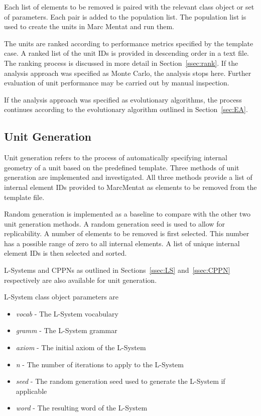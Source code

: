 Each list of elements to be removed is paired with the relevant class object or set of parameters. Each pair is added to the population list. The population list is used to create the units in Marc Mentat and run them.

The units are ranked according to performance metrics specified by the template case. A ranked list of the unit IDs is provided in descending order in a text file. The ranking process is discussed in more detail in Section~\ref{ssec:rank}. If the analysis approach was specified as Monte Carlo, the analysis stops here. Further evaluation of unit performance may be carried out by manual inspection.

If the analysis approach was specified as evolutionary algorithms, the process continues according to the evolutionary algorithm outlined in Section~\ref{sec:EA}.

\subsection{Unit Generation}
\label{ssec:ug}

Unit generation refers to the process of automatically specifying internal geometry of a unit based on the predefined template. Three methods of unit generation are implemented and investigated. All three methods provide a list of internal element IDs provided to MarcMentat as elements to be removed from the template file.

Random generation is implemented as a baseline to compare with the other two unit generation methods. A random generation seed is used to allow for replicability. A number of elements to be removed is first selected. This number has a possible range of zero to all internal elements. A list of unique internal element IDs is then selected and sorted.

L-Systems and CPPNs as outlined in Sections~\ref{ssec:LS} and~\ref{ssec:CPPN} respectively are also available for unit generation.

L-System class object parameters are

\begin{itemize}
	\item \textit{vocab} - The L-System vocabulary
	\item \textit{gramm} - The L-System grammar
	\item \textit{axiom} - The initial axiom of the L-System
	\item \textit{n} - The number of iterations to apply to the L-System
	\item \textit{seed} - The random generation seed used to generate the L-System if applicable
	\item \textit{word} - The resulting word of the L-System
\end{itemize}

